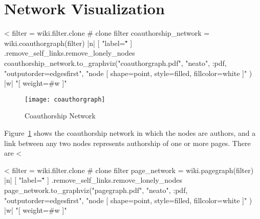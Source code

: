 \documentclass{scrartcl}
\begin{document}

\section{Network Visualization} %
\label{sec:network_visualization}

<%
filter = wiki.filter.clone # clone filter
coauthorship_network = wiki.coauthorgraph(filter) { |n| [ "label=\"\"" ] }.remove_self_links.remove_lonely_nodes
coauthorship_network.to_graphviz("coauthorgraph.pdf", "neato", :pdf, "outputorder=edgesfirst", "node [ shape=point, style=filled, fillcolor=white ]" ) { |w|  "[ weight=#{w} ]" }
\begin{figure}[htbp]
	\centering
	\texttt{[image: coauthorgraph]}
	\caption{Coauthorship Network}
	\label{fig:coauthorship_network}
\end{figure}

Figure~\ref{fig:coauthorship_network} shows the coauthorship network in which the nodes are authors, and a link between any two nodes represents authorship of one or more pages. There are <%



<%
filter = wiki.filter.clone # clone filter
page_network = wiki.pagegraph(filter) { |n| [ "label=\"\"" ] }.remove_self_links.remove_lonely_nodes
page_network.to_graphviz("pagegraph.pdf", "neato", :pdf, "outputorder=edgesfirst", "node [ shape=point, style=filled, fillcolor=white ]" ) { |w|  "[ weight=#{w} ]" }
\end{document}
